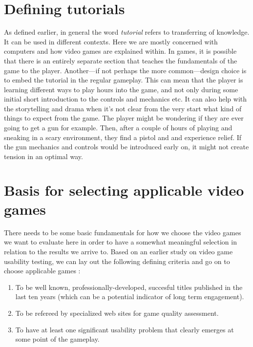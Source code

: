 \section{Defining tutorials}
As defined earlier, in general the word \textit{tutorial} refers to transferring of knowledge. It can be used in different contexts. Here we are mostly concerned with computers and how video games are explained within. In games, it is possible that there is an entirely separate section that teaches the fundamentals of the game to the player. Another---if not perhaps the more common---design choice is to embed the tutorial in the regular gameplay. This can mean that the player is learning different ways to play hours into the game, and not only during some initial short introduction to the controls and mechanics etc. It can also help with the storytelling and drama when it's not clear from the very start what kind of things to expect from the game. The player might be wondering if they are ever going to get a gun for example. Then, after a couple of hours of playing and sneaking in a scary environment, they find a pistol and and experience relief. If the gun mechanics and controls would be introduced early on, it might not create tension in an optimal way.

\section{Basis for selecting applicable video games}
There needs to be some basic fundamentals for how we choose the video games we want to evaluate here in order to have a somewhat meaningful selection in relation to the results we arrive to. Based on an earlier study on video game usability testing, we can lay out the following defining criteria and go on to choose applicable games \cite{Febretti2009a}:
\begin{enumerate}
	\item To be well known, professionally-developed, succesful titles published in the last ten years (which can be a potential indicator of long term engagement).
	\item To be refereed by specialized web sites for game quality assessment.
	\item To have at least one significant usability problem that clearly emerges at some point of the gameplay.
\end{enumerate}

